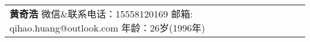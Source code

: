 \newcommand{\myheader}{
\begin{tabular*}{\textwidth}{l@{\extracolsep{\fill}}r}
  \specialrule{0em}{4pt}{4pt}
  \textbf{\huge 黄奇浩} \quad 微信\&联系电话：15558120169 \quad 邮箱: qihao.huang@outlook.com \quad 年龄：26岁(1996年)\\ 
  \end{tabular*}\\\vspace{0.1in}
  
  \vspace{0.1in}
}

\myheader

